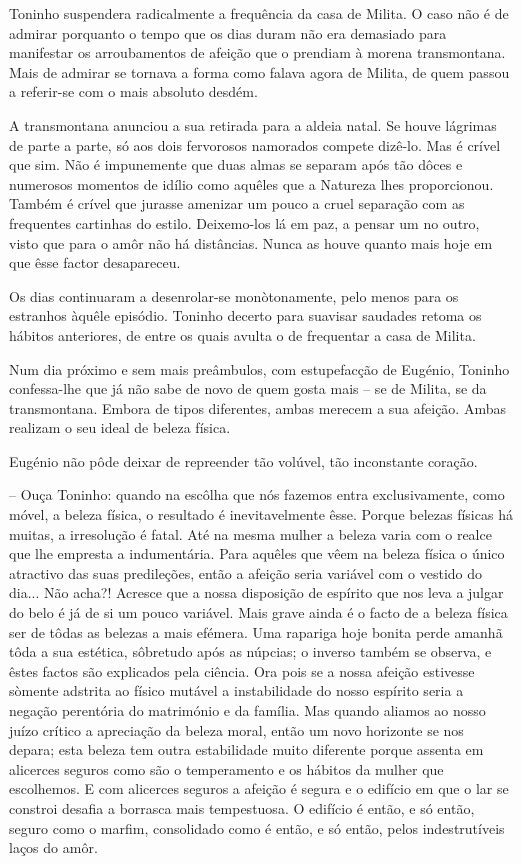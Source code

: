 \documentclass[9pt]{article}
\begin{document}
Toninho suspendera radicalmente a frequência da casa de Milita. O caso
não é de admirar porquanto o tempo que os dias duram não era demasiado para
manifestar os arroubamentos de afei\-ção que o prendiam à morena transmontana.
Mais de admirar se tornava a forma como falava agora de Milita, de quem passou a referir-se com o mais absoluto desdém.

A transmontana anunciou a sua retirada para a aldeia natal. Se houve
lágrimas de parte a parte, só aos dois fervorosos namorados compete dizê-lo.
Mas é crível que sim. Não é impunemente que duas almas se separam após tão
dôces e numerosos momentos de idílio como a\-quê\-les que a Natureza lhes proporcionou. Também é crível que jurasse amenizar um pouco a cruel separa\-ção com
as frequentes cartinhas do estilo. Deixemo-los lá em paz, a pensar um no outro, visto que para o amôr não há distâncias. Nunca as houve quanto mais hoje
em que êsse factor desapareceu.

Os dias continuaram a desenrolar-se monòtonamente, pelo menos para os
estranhos àquêle episódio. Toninho decerto para suavisar saudades retoma os
hábitos anteriores, de entre os quais avulta o de frequentar a casa de Milita.

Num dia próximo e sem mais preâmbulos, com estupefac\-ção de Eugénio, Toninho confessa-\-lhe que já não sabe de novo de quem gosta mais -- se de Milita, se
 da transmontana. Embora de tipos diferentes, ambas merecem a sua afei\-ção.
Ambas realizam o seu ideal de beleza física.

Eugé\-nio não pôde deixar de repreender tão volúvel, tão inconstante cora\-ção.

-- Ouça Toninho: quan\-do na escô\-lha que nós fazemos entra exclusivamente,
como móvel, a beleza física, o resultado é inevitavelmente êsse. Porque belezas físicas há muitas, a irresolu\-ção é fatal. Até na mesma mu\-lher a beleza
varia com o realce que lhe empresta a indumentária. Para a\-quê\-les que vêem
na beleza física o único atractivo das suas predile\-ções, então a afei\-ção seria
variável com o vestido do dia... Não acha?! Acresce que a nossa disposi\-ção
de espírito que nos leva a julgar do belo é já de si um pouco variável. Mais
grave ainda é o facto de a beleza física ser de tôdas as belezas a mais efémera. Uma rapariga hoje bonita perde a\-ma\-nhã tôda a sua estética, sôbretudo
após as núpcias; o inverso também se observa, e êstes factos são explicados
pela ciência. Ora pois se a nossa afei\-ção estivesse sòmente adstrita ao
físico mutável a instabilidade do nosso espírito seria a nega\-ção perentória do matrimónio e da fa\-mí\-lia. Mas quan\-do aliamos ao nosso juízo crítico a aprecia\-ção
da beleza moral, então um novo horizonte se nos depara; esta beleza tem outra
estabilidade muito diferente porque assenta em alicerces seguros como são o
temperamento e os hábitos da mu\-lher que esco\-lhemos. E com alicerces seguros a
afei\-ção é segura e o edifício em que o lar se constroi desafia a borrasca
 mais tempestuosa. O edifício é então, e só então, seguro como o marfim, consolidado como é então, e só então,  pelos indestrutíveis laços do amôr.
\end{document}
